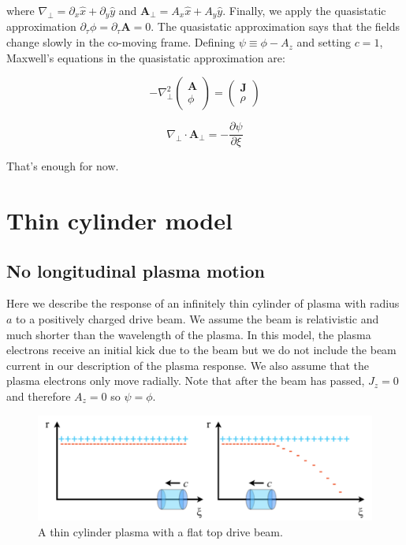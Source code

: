 \documentclass[aps,prl,preprint,groupedaddress]{revtex4-1}
\newcommand{\webvector}[2]{\left( \begin{array}{c} #1 \\ #2 \end{array} \right)}
\begin{document}
where $\nabla_\perp = \partial_x \hat x + \partial_y \hat y$ and $\mathbf{A}_\perp = A_x \hat x + A_y \hat y$. Finally, we apply the quasistatic approximation $\partial_\tau \phi = \partial_\tau \mathbf{A} = 0$. The quasistatic approximation says that the fields change slowly in the co-moving frame. Defining $\psi \equiv \phi - A_z$ and setting $c = 1$, Maxwell's equations in the quasistatic approximation are:

\begin{equation}\label{eq:max_qs}
-\nabla^2_\perp \webvector{\mathbf{A}}{\phi} = \webvector{\mathbf{J}}{\rho}
\end{equation}

\begin{equation}\label{eq:gauge_qs}
\nabla_\perp \cdot \mathbf{A}_\perp = -\frac{\partial \psi}{\partial \xi}
\end{equation}

That's enough for now.

\section{Thin cylinder model}
\subsection{No longitudinal plasma motion}
Here we describe the response of an infinitely thin cylinder of plasma with radius $a$ to a positively charged drive beam. We assume the beam is relativistic and much shorter than the wavelength of the plasma. In this model, the plasma electrons receive an initial kick due to the beam but we do not include the beam current in our description of the plasma response. We also assume that the plasma electrons only move radially. Note that after the beam has passed, $J_z=0$ and therefore $A_z=0$ so $\psi=\phi$.

\begin{figure}[ht]\label{fig:thin_cyl}
  \centering
    \includegraphics[width=150mm]{./figures/thin_cyl.pdf}
      \caption{A thin cylinder plasma with a flat top drive beam.}
\end{figure}
\end{document}

